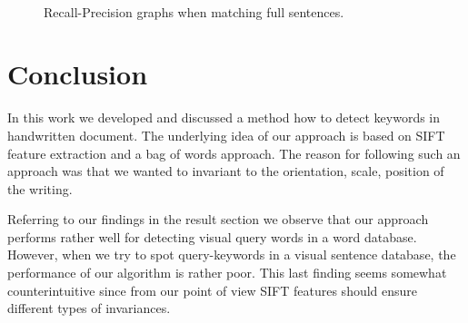 \documentclass[conference]{IEEEtran}
\begin{document}
\begin{figure}[ht!]%
\centering
{}
\\
\caption{Recall-Precision graphs when matching full sentences.}
\label{fig:Results_sentences}
\end{figure}

\section{Conclusion}
In this work we developed and discussed a method how to detect keywords in handwritten document. The underlying idea of our approach is based on SIFT feature extraction and a bag of words approach. The reason for following such an approach was that we wanted to invariant to the orientation, scale, position of the writing. 

Referring to our findings in the result section we observe that our approach performs rather well for detecting visual query words in a word database. 
However, when we try to spot query-keywords in a visual sentence database, 
the performance of our algorithm is rather poor. 
This last finding seems somewhat counterintuitive since from our point of view SIFT features should ensure different types of invariances. 
\end{document}
